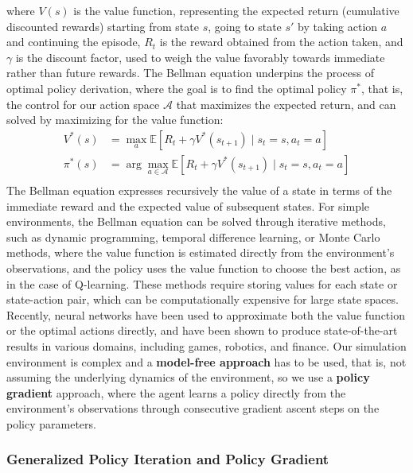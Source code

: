 where $V(s)$ is the value function, representing the expected return (cumulative discounted rewards) starting from state $s$,
going to state $s'$ by taking action $a$ and continuing the episode, $R_t$ is the reward obtained from the action taken,
and $\gamma$ is the discount factor, used to weigh the value favorably towards immediate rather than future rewards.
The Bellman equation underpins the process of optimal policy derivation, where the goal is to find the optimal policy $\pi^*$,
that is, the control for our action space $\mathcal{A}$ that maximizes the expected return,
and can solved by maximizing for the value function:
\begin{equation*}
    \begin{aligned}
        V^*(s) &= \max_a \mathbb{E} \left[ R_t + \gamma V^*(s_{t+1}) \mid s_t = s, a_t = a \right]\\
        \pi^*(s) &= \arg \max_{a \in \mathcal{A}} \mathbb{E} \left[ R_t + \gamma V^*(s_{t+1}) \mid s_t = s, a_t = a \right]\\
    \end{aligned}
\end{equation*}
The Bellman equation expresses recursively the value of a state in terms of the immediate reward and the expected value of subsequent states.
For simple environments, the Bellman equation can be solved through iterative methods, such as dynamic programming,
temporal difference learning, or Monte Carlo methods, where the value function is estimated directly from the environment's observations,
and the policy uses the value function to choose the best action, as in the case of Q-learning.
These methods require storing values for each state or state-action pair, which can be computationally expensive for large state spaces.
Recently, neural networks have been used to approximate both the value function or the optimal actions directly,
and have been shown to produce state-of-the-art results in various domains, including games, robotics, and finance.
Our simulation environment is complex and a \textbf{model-free approach} has to be used, that is, not assuming the underlying dynamics of the environment,
so we use a \textbf{policy gradient} approach, where the agent learns a policy directly from the environment's observations
through consecutive gradient ascent steps on the policy parameters.

\subsubsection{Generalized Policy Iteration and Policy Gradient}
\label{subsubsec:gpi}

